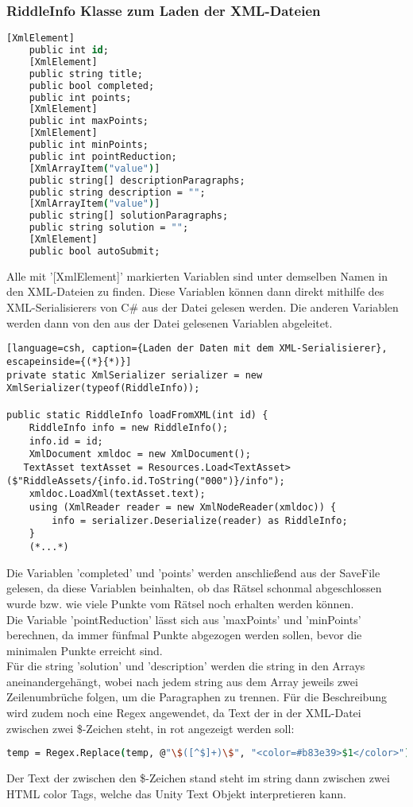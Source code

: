 \subsubsection{RiddleInfo Klasse zum Laden der XML-Dateien}
\label{sub:RiddleInfo}
\begin{lstlisting}[language=csh, caption={In der Klasse gespeicherte Daten}]
	[XmlElement]
    public int id;
    [XmlElement]
    public string title;
    public bool completed;
    public int points;
    [XmlElement]
    public int maxPoints;
    [XmlElement]
    public int minPoints;
    public int pointReduction;
    [XmlArrayItem("value")]
    public string[] descriptionParagraphs;
    public string description = "";
    [XmlArrayItem("value")]
    public string[] solutionParagraphs;
    public string solution = "";
    [XmlElement]
    public bool autoSubmit;
\end{lstlisting}
Alle mit '[XmlElement]' markierten Variablen sind unter demselben Namen in den XML-Dateien zu finden. Diese Variablen können dann direkt mithilfe des XML-Serialisierers von C\# aus der Datei gelesen werden. Die anderen Variablen werden dann von den aus der Datei gelesenen Variablen abgeleitet.\\
\begin{lstlisting}[language=csh, caption={Laden der Daten mit dem XML-Serialisierer}, escapeinside={(*}{*)}]
private static XmlSerializer serializer = new XmlSerializer(typeof(RiddleInfo));

public static RiddleInfo loadFromXML(int id) {
    RiddleInfo info = new RiddleInfo();
    info.id = id;
    XmlDocument xmldoc = new XmlDocument();
   TextAsset textAsset = Resources.Load<TextAsset>($"RiddleAssets/{info.id.ToString("000")}/info");
    xmldoc.LoadXml(textAsset.text);
    using (XmlReader reader = new XmlNodeReader(xmldoc)) {
        info = serializer.Deserialize(reader) as RiddleInfo;
    }
    (*...*)
\end{lstlisting}
Die Variablen 'completed' und 'points' werden anschließend aus der SaveFile gelesen, da diese Variablen beinhalten, ob das Rätsel schonmal abgeschlossen wurde bzw. wie viele Punkte vom Rätsel noch erhalten werden können.\\
Die Variable 'pointReduction' lässt sich aus 'maxPoints' und 'minPoints' berechnen, da immer fünfmal Punkte abgezogen werden sollen, bevor die minimalen Punkte erreicht sind.\\
Für die string 'solution' und 'description' werden die string in den Arrays aneinandergehängt, wobei nach jedem string aus dem Array jeweils zwei Zeilenumbrüche folgen, um die Paragraphen zu trennen. Für die Beschreibung wird zudem noch eine Regex angewendet, da Text der in der XML-Datei zwischen zwei \$-Zeichen steht, in rot angezeigt werden soll:
\begin{lstlisting}[language=csh, caption={Regex um Text zwischen \$-Zeichen rot zu färben}]
temp = Regex.Replace(temp, @"\$([^$]+)\$", "<color=#b83e39>$1</color>");
\end{lstlisting}
Der Text der zwischen den \$-Zeichen stand steht im string dann zwischen zwei HTML color Tags, welche das Unity Text Objekt interpretieren kann.\\

